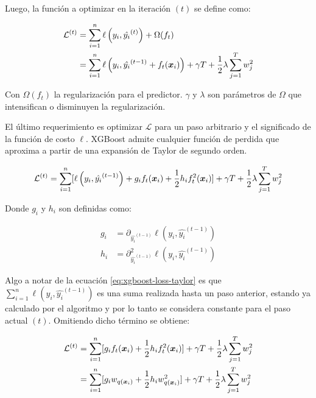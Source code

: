 Luego, la función a optimizar en la iteración $(t)$ se define como:

\begin{align}
    \mathcal{L}^{(t)} &= \sum_{i=1}^{n} \ell\left( y_i, \hat{y_i}^{(t)} \right) + \Omega(f_t) \\
                      &= \sum_{i=1}^{n} \ell\left( y_i, \hat{y_i}^{(t - 1)} + f_t{(\boldsymbol{x}_i)} \right) + \gamma T + \frac{1}{2} \lambda \sum_{j=1}^{T} w_{j}^{2}
\end{align}

Con $\Omega(f_t)$ la regularización para el predictor. $\gamma$ y $\lambda$ son parámetros de $\Omega$ que intensifican o disminuyen la regularización.

El último requerimiento es optimizar $\mathcal{L}$ para un paso arbitrario y el
significado de la función de costo $\ell$. XGBoost admite cualquier función de
perdida que aproxima a partir de una expansión de Taylor de segundo orden.

\begin{equation} \label{eq:xgboost-loss-taylor}
    \mathcal{L}^{(t)} = \sum_{i = 1}^{n} [
        \ell\left(y_i,
                  \hat{y_{i}}^{(t-1)}
            \right) +
                g_i f_t(\boldsymbol{x}_i) +
                \frac{1}{2} h_i f_t^{2}(\boldsymbol{x}_i)
        ] + \gamma T + \frac{1}{2} \lambda \sum_{j=1}^{T} w_{j}^{2}
\end{equation}

Donde $g_i$ y $h_i$ son definidas como:

\begin{align}
    g_i &= \partial_{\hat{y_{i}}^{(t-1)}} \ell\left(y_i, \hat{y_{i}}^{(t-1)}\right) \\
    h_i &= \partial_{\hat{y_{i}}^{(t-1)}}^{2} \ell\left(y_i, \hat{y_{i}}^{(t-1)}\right)
\end{align}

Algo a notar de la ecuación \ref{eq:xgboost-loss-taylor} es que $\sum_{i =
1}^{n} \ell\left(y_i, \hat{y_{i}}^{(t-1)} \right)$ es una suma realizada hasta
un paso anterior, estando ya calculado por el algoritmo y por lo tanto se
considera constante para el paso actual $(t)$. Omitiendo dicho término se
obtiene:

\begin{align}
    \mathcal{L}^{(t)} &= \sum_{i = 1}^{n} [
        g_i f_t(\boldsymbol{x}_i) +
                \frac{1}{2} h_i f_t^{2}(\boldsymbol{x}_i)
        ] + \gamma T + \frac{1}{2} \lambda \sum_{j=1}^{T} w_{j}^{2} \\
                      &= \sum_{i = 1}^{n} [ \label{eq:xgboost-loss-final}
                        g_i w_{q(\boldsymbol{x}_i)} +
                                \frac{1}{2} h_i w_{q(\boldsymbol{x}_i)}^{2}
                        ] + \gamma T + \frac{1}{2} \lambda \sum_{j=1}^{T} w_{j}^{2}
\end{align}

